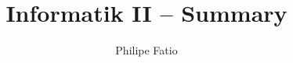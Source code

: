 \documentclass[10pt,fleqn,english,article]{memoir}
\title{Informatik II -- Summary}
\author{Philipe Fatio}
\begin{document}
	\begin{multicols*}{3}
	\end{multicols*}
\end{document}
